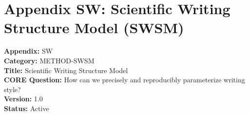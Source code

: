 %
%
%

\section*{Appendix SW: Scientific Writing Structure Model (SWSM)}
\label{app:sw}


\begin{tcolorbox}[colback=blue!5!white, colframe=blue!75!black, title=Appendix Metadata]
\textbf{Appendix:} SW \\
\textbf{Category:} METHOD-SWSM \\
\textbf{Title:} Scientific Writing Structure Model \\
\textbf{CORE Question:} How can we precisely and reproducibly parameterize writing style? \\
\textbf{Version:} 1.0 \\
\textbf{Status:} Active
\end{tcolorbox}


